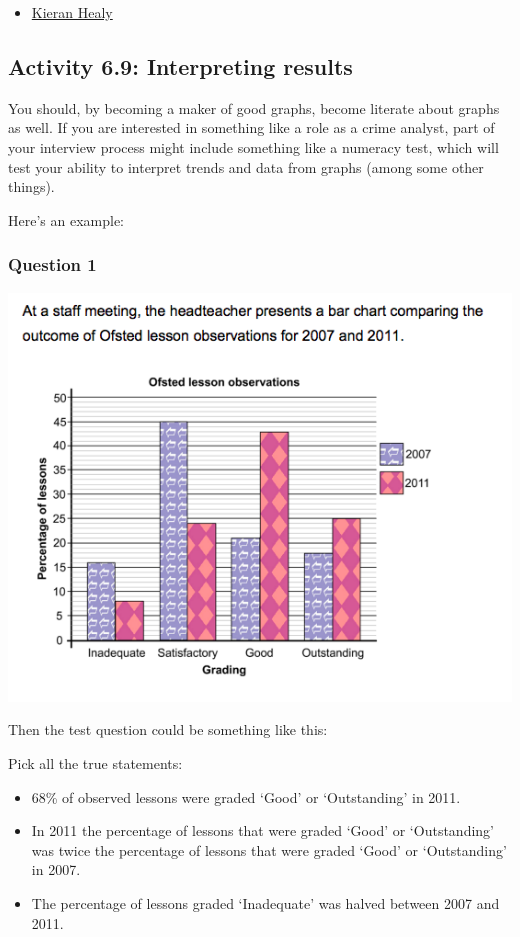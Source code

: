 \documentclass[
]{book}
\providecommand{\tightlist}{%
  \setlength{\itemsep}{0pt}\setlength{\parskip}{0pt}}
\begin{document}
\begin{itemize}
\tightlist
\item
  \href{http://socviz.co/}{Kieran Healy}
\end{itemize}

\hypertarget{activity-6.9-interpreting-results}{%
\subsection{Activity 6.9: Interpreting results}\label{activity-6.9-interpreting-results}}

You should, by becoming a maker of good graphs, become literate about graphs as well. If you are interested in something like a role as a crime analyst, part of your interview process might include something like a numeracy test, which will test your ability to interpret trends and data from graphs (among some other things).

Here's an example:

\hypertarget{question-1}{%
\subsubsection*{Question 1}\label{question-1}}

\includegraphics{imgs/numtest_1.png}

Then the test question could be something like this:

Pick all the true statements:

\begin{itemize}
\tightlist
\item
  68\% of observed lessons were graded `Good' or `Outstanding' in 2011.
\item
  In 2011 the percentage of lessons that were graded `Good' or `Outstanding' was twice the percentage of lessons that were graded `Good' or `Outstanding' in 2007.
\item
  The percentage of lessons graded `Inadequate' was halved between 2007 and 2011.
\end{itemize}
\end{document}
